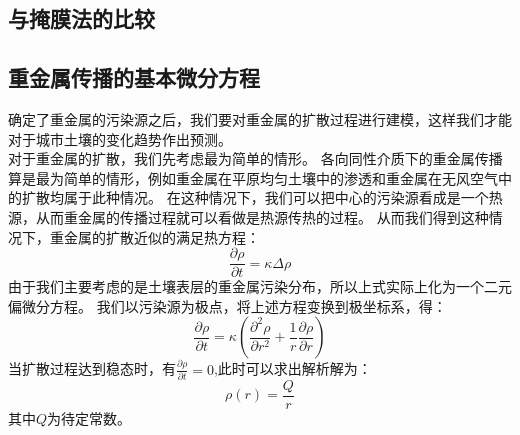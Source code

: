 \documentclass[a4paper]{article}
\begin{document}
\subsection{与掩膜法的比较}


\subsection{重金属传播的基本微分方程}
确定了重金属的污染源之后，我们要对重金属的扩散过程进行建模，这样我们才能对于城市土壤的变化趋势作出预测。  \\
\indent 对于重金属的扩散，我们先考虑最为简单的情形。
各向同性介质下的重金属传播算是最为简单的情形，例如重金属在平原均匀土壤中的渗透和重金属在无风空气中的扩散均属于此种情况。
在这种情况下，我们可以把中心的污染源看成是一个热源，从而重金属的传播过程就可以看做是热源传热的过程。
从而我们得到这种情况下，重金属的扩散近似的满足热方程：
\begin{equation}
\frac{\partial \rho}{\partial t} = \kappa \Delta \rho
\end{equation}
由于我们主要考虑的是土壤表层的重金属污染分布，所以上式实际上化为一个二元偏微分方程。
我们以污染源为极点，将上述方程变换到极坐标系，得：
\begin{equation}
\frac{\partial \rho}{\partial t} = \kappa(\frac{\partial^2 \rho}{\partial r^2}+\frac{1}{r}\frac{\partial \rho}{\partial r})
\end{equation}
当扩散过程达到稳态时，有$\frac{\partial \rho}{\partial t} = 0$,此时可以求出解析解为：
\begin{equation}
\rho(r) = \frac{Q}{r}
\end{equation}
其中$Q$为待定常数。\\
\end{document}
